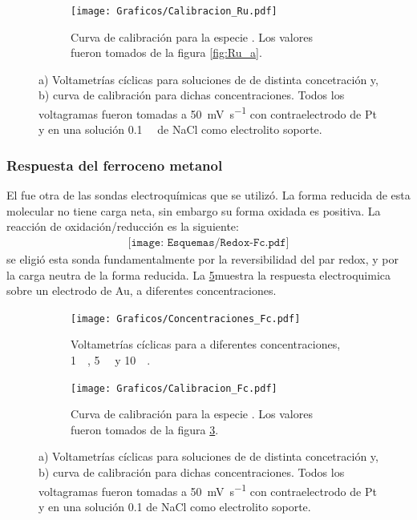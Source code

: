 {\begin{figure}[ht]
\begin{subfigure}[t]{0.495\textwidth}
	     		\end{subfigure}
     		 \begin{subfigure}[t]{0.495\textwidth}
	        	\texttt{[image: Graficos/Calibracion\_Ru.pdf]}
	       		\caption{Curva de calibración para la especie \ru. Los valores fueron tomados de la figura \ref{fig:Ru_a}.}
	         	\label{fig:Ru_b}
	     		\end{subfigure}
	     		\label{rutenio}
	     		\caption[Respuesta electroquímica para \ru]{a) Voltametrías cíclicas para soluciones de \ru\space de distinta concetración y, b) curva de calibración para dichas concentraciones. Todos los voltagramas fueron tomadas a \SI{50}{\milli\volt\per\second} con contraelectrodo de Pt y en una solución \SI{0.1}{\milli\Molar} de NaCl como electrolito soporte.}
	     	 \end{figure}
			 		 	 
		\subsubsection*{Respuesta del ferroceno metanol}
 	 	  El \fc\space fue otra de las sondas electroquímicas que se utilizó. La forma reducida de esta molecular no tiene carga neta, sin embargo su forma oxidada es positiva. La reacción de oxidación/reducción es la siguiente:
 	 				 \begin{equation}
 	 	 				\begin{aligned}
 	 	 				\texttt{[image: Esquemas/Redox-Fc.pdf]}
 	 	 				\end{aligned}
 	 	 			 \end{equation}
 	 	  se eligió esta sonda fundamentalmente por la reversibilidad del par redox, y por la carga neutra de la forma reducida. La \ref{Fig:Fc}muestra la respuesta electroquimica sobre un electrodo de Au, a diferentes concentraciones.
		 		 \begin{figure}[ht]
		 	      \begin{subfigure}[t]{0.495\textwidth}
		          	\texttt{[image: Graficos/Concentraciones\_Fc.pdf]}
		         	\caption{Voltametrías cíclicas para \fc\space a diferentes concentraciones, \SI{1}{\milli\Molar}, \SI{5}{\milli\Molar} y \SI{10}{\milli\Molar}.}
		          	\label{fig:Fc_a}
		      		\end{subfigure}
		      	 \begin{subfigure}[t]{0.495\textwidth}
		          	\texttt{[image: Graficos/Calibracion\_Fc.pdf]}
		         	\caption{Curva de calibración para la especie \fc. Los valores fueron tomados de la figura \ref{fig:Fc_a}.}
		          	\label{fig:Fc_b}
		      		\end{subfigure}
		      	 \caption[Respuesta electroquímica para \fc]{a) Voltametrías cíclicas para soluciones de \fc\space de distinta concetración y, b) curva de calibración para dichas concentraciones. Todos los voltagramas fueron tomadas a \SI{50}{\milli\volt\per\second} con contraelectrodo de Pt y en una solución \SI{0.1}{\Molar} de NaCl como electrolito soporte.}
		      	 \label{Fig:Fc}
	      		 \end{figure}

}
